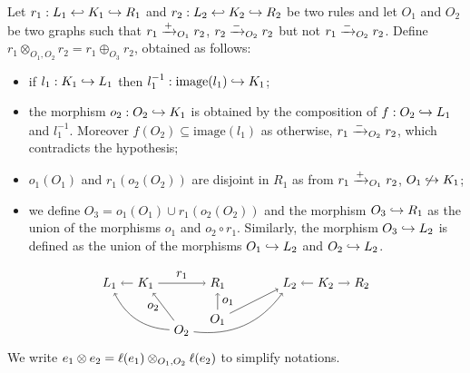 \begin{definition}
  \label{def:ref_pos_neg_infl}
  Let $r_1:L_1\hookleftarrow K_1 \hookrightarrow R_1$ and $r_2:L_2\hookleftarrow K_2 \hookrightarrow R_2$ be two rules and let $O_1$ and $O_2$ be two graphs such that $r_1\mathrel{\xrightarrow{+}}_{O_1} r_2$, $r_2\mathrel{\xrightarrow{-}}_{O_2} r_2$ but not $r_1\mathrel{\xrightarrow{-}}_{O_2} r_2$. Define $r_1\otimes_{O_1,O_2} r_2 = r_1 \oplus_{O_3} r_2$, obtained as follows:
  \begin{itemize}
  \item if $l_1:K_1\hookrightarrow L_1$ then $l_1^{-1}:\text{image}(l_1)\hookrightarrow K_1$;
  \item the morphism $o_2:O_2\hookrightarrow K_1$ is obtained by the composition of $f:O_2\hookrightarrow L_1$ and $l_1^{-1}$. Moreover $f(O_2)\subseteq\text{image}(l_1)$ as otherwise, $r_1\mathrel{\xrightarrow{-}}_{O_2} r_2$, which contradicts the hypothesis;
  \item $o_1(O_1)$ and $r_1(o_2(O_2))$ are disjoint in $R_1$ as from $r_1\mathrel{\xrightarrow{+}}_{O_1} r_2$, $O_1\not\hookrightarrow K_1$;
  \item we define $O_3=o_1(O_1)\cup r_1(o_2(O_2))$ and the morphism $O_3\hookrightarrow R_1$ as the union of the morphisms $o_1$ and $o_2\circ r_1$. Similarly, the morphism $O_3\hookrightarrow L_2$ is defined as the union of the morphisms $O_1\hookrightarrow L_2$ and $O_2\hookrightarrow L_2$.
  \end{itemize}
  \[
  \begin{tikzpicture} %
  \node (o) at (-1,-1) {\(O_1\)};
  \node (o2) at (-2,-1.3) {\(O_2\)};
  \node (r1) at (-1,0) {\(R_1\)};
  \node (k1) at (-3,0) {\(K_1\)};
  \node (l1) at (-4,0) {\(L_1\)};
  \node (l2) at (1,0) {\(L_2\)};
  \node (k2) at (2,0) {\(K_2\)};
  \node (r2) at (3,0) {\(R_2\)};
  \draw [->] (o) -- node [right,midway] {\(o_1\)} (r1);
  \draw [->] (o) -- (l2);
  \draw [->] (k1) -- node [above,midway] {\(r_1\)} (r1);
  \draw [->] (k1) -- (l1);
  \draw [->] (k2) -- (r2);
  \draw [->] (k2) -- (l2);
  \draw [->] (o2) to [bend left] (l1);
  \draw [->] (o2) to [bend right] (l2);
  \draw [->] (o2) -- node [left,midway] {\(o_2\)} (k1);
  \end{tikzpicture}
  \]
  We write $e_1\otimes e_2 = \ell(e_1)\otimes_{O_1,O_2} \ell(e_2)$ to simplify notations.
\end{definition}

